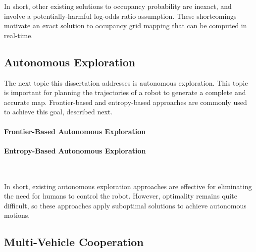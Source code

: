 \documentclass[thesis]{thesis-gwu}
\begin{document}
In short, other existing solutions to occupancy probability are inexact, and involve a potentially-harmful log-odds ratio assumption. These shortcomings motivate an exact solution to occupancy grid mapping that can be computed in real-time.




\subsection{Autonomous Exploration}

The next topic this dissertation addresses is autonomous exploration. This topic is important for planning the trajectories of a robot to generate a complete and accurate map. Frontier-based and entropy-based approaches are commonly used to achieve this goal, described next.

\paragraph{Frontier-Based Autonomous Exploration}


\paragraph{Entropy-Based Autonomous Exploration}

\

In short, existing autonomous exploration approaches are effective for eliminating the need for humans to control the robot. However, optimality remains quite difficult, so these approaches apply suboptimal solutions to achieve autonomous motions.


\subsection{Multi-Vehicle Cooperation}
\end{document}
